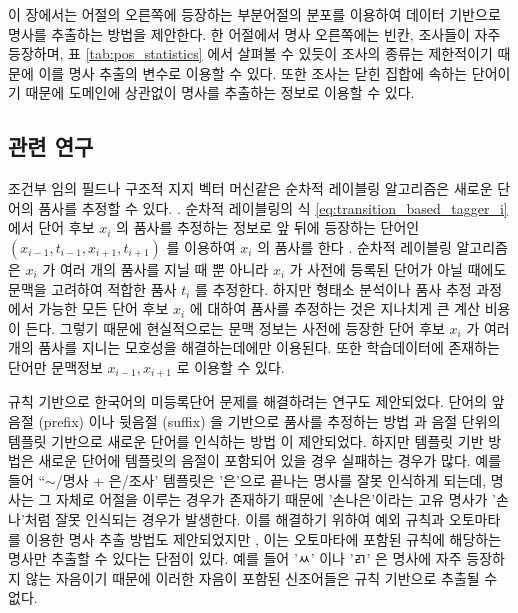 \documentclass[11pt]{article}
\begin{document}
이 장에서는 어절의 오른쪽에 등장하는 부분어절의 분포를 이용하여 데이터 기반으로 명사를 추출하는 방법을 제안한다.
한 어절에서 명사 오른쪽에는 빈칸, 조사들이 자주 등장하며, 표 \ref{tab:pos_statistics} 에서 살펴볼 수 있듯이 조사의 종류는 제한적이기 때문에 이를 명사 추출의 변수로 이용할 수 있다.
또한 조사는 닫힌 집합에 속하는 단어이기 때문에 도메인에 상관없이 명사를 추출하는 정보로 이용할 수 있다.


\subsection{관련 연구}

조건부 임의 필드나 구조적 지지 벡터 머신같은 순차적 레이블링 알고리즘은 새로운 단어의 품사를 추정할 수 있다. \citep{shim2004high, shim2007made, na2012crfs, lee2013joint}.
순차적 레이블링의 식 \ref{eq:transition_based_tagger_i} 에서 단어 후보 $x_i$ 의 품사를 추정하는 정보로 앞 뒤에 등장하는 단어인 $(x_{i-1}, t_{i-1}, x_{i+1}, t_{i+1})$ 를 이용하여 $x_i$ 의 품사를 한다 \citep{shim2004high, shim2007made, na2012crfs, lee2013joint}.
순차적 레이블링 알고리즘은 $x_i$ 가 여러 개의 품사를 지닐 때 뿐 아니라 $x_i$ 가 사전에 등록된 단어가 아닐 때에도 문맥을 고려하여 적합한 품사 $t_i$ 를 추정한다.
하지만 형태소 분석이나 품사 추정 과정에서 가능한 모든 단어 후보 $x_i$ 에 대하여 품사를 추정하는 것은 지나치게 큰 계산 비용이 든다.
그렇기 때문에 현실적으로는 문맥 정보는 사전에 등장한 단어 후보 $x_i$ 가 여러 개의 품사를 지니는 모호성을 해결하는데에만 이용된다.
또한 학습데이터에 존재하는 단어만 문맥정보 $x_{i-1}, x_{i+1}$ 로 이용할 수 있다.

규칙 기반으로 한국어의 미등록단어 문제를 해결하려는 연구도 제안되었다.
단어의 앞음절 (prefix) 이나 뒷음절 (suffix) 을 기반으로 품사를 추정하는 방법 \citep{Lee2016functional} 과 음절 단위의 템플릿 기반으로 새로운 단어를 인식하는 방법 \citep{hong2008new} 이 제안되었다.
하지만 템플릿 기반 방법은 새로운 단어에 템플릿의 음절이 포함되어 있을 경우 실패하는 경우가 많다.
예를 들어 “$\sim$/명사 + 은/조사' 템플릿은 '은'으로 끝나는 명사를 잘못 인식하게 되는데, 명사는 그 자체로 어절을 이루는 경우가 존재하기 때문에 '손나은'이라는 고유 명사가 '손나'처럼 잘못 인식되는 경우가 발생한다.
이를 해결하기 위하여 예외 규칙과 오토마타를 이용한 명사 추출 방법도 제안되었지만 \citep{lee2003efficient}, 이는 오토마타에 포함된 규칙에 해당하는 명사만 추출할 수 있다는 단점이 있다.
예를 들어 'ㅆ' 이나 'ㄺ' 은 명사에 자주 등장하지 않는 자음이기 때문에 이러한 자음이 포함된 신조어들은 규칙 기반으로 추출될 수 없다.
\end{document}
